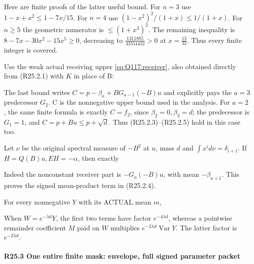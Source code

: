 Here are finite proofs of the latter useful bound. For \(n=3\) use \(1-x+x^2\le 1-7x/15\). For \(n=4\) use \((1-x^2)^2/(1+x)\le 1/(1+x)\). For \(n\ge 5\) the geometric numerator is \(\le (1+x^3)^2\). The remaining inequality is \(8-7x-30x^2-15x^5\ge 0\), decreasing to \(\frac{1311885}{33554432}>0\) at \(x=\frac{13}{32}\). Thus every finite integer is covered.

Use the weak actual receiving upper \eqref{eq:Q117:receiver},
also obtained directly from (R25.2.1) with \(K\) in place of B:


The last bound writes \(C=p-\beta_a+B G_{a-1}(-B)u\) and explicitly pays the \(a=3\) predecessor \(G_{2}\). C is the nonnegative upper bound used in the analysis.
For \(a=2\), the same finite formula is exactly \(C=f_2\), since
\(\beta_2=0,\beta_3=d\); the predecessor is \(G_1=1\), and
\(C=p+Bu\le p+\sqrt d\). Thus (R25.2.3)--(R25.2.5) hold in this case too.

Let \(\nu\) be the original spectral measure of \(-B^2\) at \(u\), mass \(d\) and \(\int  x^i d\nu=\delta_{i+1}\). If \(H=Q(B)u,\allowbreak \allowbreak  EH=-\alpha\), then exactly


Indeed the nonconstant receiver part is \(-G_a(-B)u\), with mean \(-\beta_{a+1}\). This proves the signed mean-product term in (R25.2.4).

For every nonnegative \(Y\) with its ACTUAL mean \(m\),


When \(W=e^{-\lambda d}Y\), the first two terms have factor \(e^{-4\lambda d}\), whereas a pointwise remainder coefficient \(M\) paid on \(W\) multiplies \(e^{-2\lambda d} \operatorname{Var} Y\). The latter factor is \(e^{-2\lambda d}\).

\paragraph{R25.3 One entire finite mask: envelope, full signed parameter packet}\label{part:R25.3}

